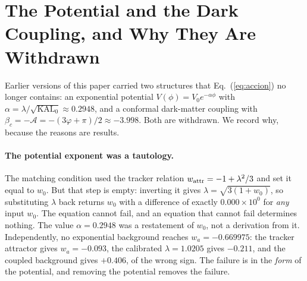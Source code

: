\documentclass[12pt,a4paper]{article}
\newcommand{\phiG}{\varphi}
\newcommand{\KAL}{\mathrm{KAL}_0}
\newcommand{\AURA}{\mathcal{A}}
\newcommand{\bc}{\beta_c}
\begin{document}
\section{The Potential and the Dark Coupling, and Why They Are Withdrawn}
\label{sec:withdrawn}
\label{sec:potential}
\label{sec:coupling}

Earlier versions of this paper carried two structures that
Eq.~(\ref{eq:accion}) no longer contains: an exponential potential
$V(\phi)=V_0e^{-\alpha\phi}$ with $\alpha = \lambda/\sqrt{\KAL} \approx
0.2948$, and a conformal dark-matter coupling with
$\bc = -\AURA = -(3\phiG+\pi)/2 \approx -3.998$.
Both are withdrawn.  We record why, because the reasons are results.

\paragraph{The potential exponent was a tautology.}
The matching condition used the tracker relation
$w_{\rm attr} = -1 + \lambda^2/3$ and set it equal to $w_0$.  But that
step is empty: inverting it gives $\lambda = \sqrt{3(1+w_0)}$, so
substituting $\lambda$ back returns $w_0$ with a difference of exactly
$0.000\times10^{0}$ for \emph{any} input $w_0$.  The equation cannot fail,
and an equation that cannot fail determines nothing.  The value
$\alpha = 0.2948$ was a restatement of $w_0$, not a derivation from it.
Independently, no exponential background reaches $w_a = -0.669975$:
the tracker attractor gives $w_a = -0.093$, the calibrated
$\lambda = 1.0205$ gives $-0.211$, and the coupled background gives
$+0.406$, of the wrong sign.  The failure is in the \emph{form} of the
potential, and removing the potential removes the failure.
\end{document}
